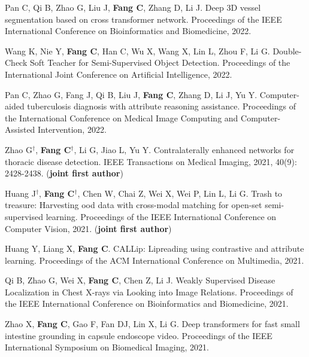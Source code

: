 \documentclass[a4paper,36pt]{article}
\newcommand{\tb}[1]{\textbf{#1}}
\newcommand{\resumeItemWithoutTitle}[1]{
  \item\justifying\small{
    {#1 \vspace{-2pt}}
  }
}
\begin{document}
\resumeItemWithoutTitle{Pan C, Qi B, Zhao G, Liu J, \tb{Fang C}, Zhang D, Li J. Deep 3D vessel segmentation based on cross transformer network. Proceedings of the IEEE International Conference on Bioinformatics and Biomedicine, 2022. }

\resumeItemWithoutTitle{Wang K, Nie Y, \tb{Fang C}, Han C, Wu X, Wang X, Lin L, Zhou F, Li G. Double-Check Soft Teacher for Semi-Supervised Object Detection. Proceedings of the International Joint Conference on Artificial Intelligence, 2022.}


\resumeItemWithoutTitle{Pan C, Zhao G, Fang J, Qi B, Liu J, \tb{Fang C}, Zhang D, Li J, Yu Y. Computer-aided tuberculosis diagnosis with attribute reasoning assistance. Proceedings of the International Conference on Medical Image Computing and Computer-Assisted Intervention, 2022.}

\resumeItemWithoutTitle{Zhao G$^\dag$, \tb{Fang C}$^\dag$, Li G, Jiao L, Yu Y. Contralaterally enhanced networks for thoracic disease detection. IEEE Transactions on Medical Imaging, 2021, 40(9): 2428-2438. (\tb{joint first author}) }

\resumeItemWithoutTitle{Huang J$^\dag$, \tb{Fang C}$^\dag$, Chen W, Chai Z, Wei X, Wei P, Lin L, Li G. Trash to treasure: Harvesting ood data with cross-modal matching for open-set semi-supervised learning. Proceedings of the IEEE International Conference on Computer Vision, 2021. (\tb{joint first author})}


\resumeItemWithoutTitle{Huang Y, Liang X, \tb{Fang C}. CALLip: Lipreading using contrastive and attribute learning. Proceedings of the ACM International Conference on Multimedia, 2021.}

\resumeItemWithoutTitle{Qi B, Zhao G, Wei X, \tb{Fang C}, Chen Z, Li J. Weakly Supervised Disease Localization in Chest X-rays via Looking into Image Relations. Proceedings of the IEEE International Conference on Bioinformatics and Biomedicine, 2021.}

\resumeItemWithoutTitle{Zhao X, \tb{Fang C}, Gao F, Fan DJ, Lin X, Li G. Deep transformers for fast small intestine grounding in capsule endoscope video. Proceedings of the IEEE International Symposium on Biomedical Imaging, 2021.}
\end{document}
